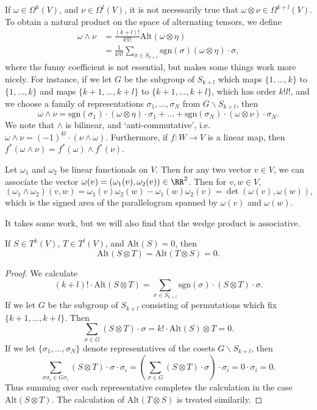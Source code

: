 If $\omega \in \Omega^k(V)$, and $\nu \in \Omega^l(V)$, it is not necessarily true that $\omega \otimes \nu \in \Omega^{k+l}(V)$. To obtain a natural product on the space of alternating tensors, we define
%
\begin{align*}
    \omega \wedge \nu &= \frac{(k+l)!}{k! l!} \text{Alt}(\omega \otimes \eta)\\
    &= \frac{1}{k!l!} \sum_{\sigma \in S_{k+l}} \text{sgn}(\sigma) (\omega \otimes \eta) \cdot \sigma,
\end{align*}
%
where the funny coefficient is not essential, but makes some things work more nicely. For instance, if we let $G$ be the subgroup of $S_{k+l}$ which maps $\{ 1, \dots, k \}$ to $\{ 1, \dots, k \}$ and maps $\{ k+1, \dots, k+l \}$ to $\{ k+1, \dots, k+l \}$, which has order $k! l!$, and we choose a family of representations $\sigma_1, \dots, \sigma_N$ from $G \backslash S_{k+l}$, then
%
\[ \omega \wedge \nu = \text{sgn}(\sigma_1) \cdot (\omega \otimes \eta) \cdot \sigma_1 + \dots + \text{sgn}(\sigma_N) \cdot (\omega \otimes \nu) \cdot \sigma_N. \]
%
We note that $\wedge$ is bilinear, and `anti-commutative', i.e. $\omega \wedge \nu = (-1)^{kl} \cdot (\nu \wedge \omega)$. Furthermore, if $f: W \to V$ is a linear map, then $f^*(\omega \wedge \nu) = f^*(\omega) \wedge f^*(\nu)$.

\begin{example}
    Let $\omega_1$ and $\omega_2$ be linear functionals on $V$. Then for any two vector $v \in V$, we can associate the vector $\omega(v) = (\omega_1(v), \omega_2(v)) \in \RR^2$. Then for $v,w \in V$,
    \[ (\omega_1 \wedge \omega_2)(v,w) = \omega_1(v) \omega_2(w) - \omega_1(w) \omega_2(v) = \det(\omega(v), \omega(w)), \]
    which is the signed area of the parallelogram spanned by $\omega(v)$ and $\omega(w)$.
\end{example}

It takes some work, but we will also find that the wedge product is associative.

\begin{lemma}
    If $S \in T^k(V)$, $T \in T^l(V)$, and $\text{Alt}(S) = 0$, then
    \[ \text{Alt}(S \otimes T) = \text{Alt}(T \otimes S) = 0. \]
\end{lemma}
\begin{proof}
    We calculate
    \[ (k+l)! \cdot \text{Alt}(S \otimes T) = \sum_{\sigma \in S_{k+l}} \text{sgn}(\sigma) \cdot (S \otimes T) \cdot \sigma. \]
    If we let $G$ be the subgroup of $S_{k+l}$ consisting of permutations which fix $\{ k+1, \dots, k+l \}$. Then
    \[ \sum_{\sigma \in G} (S \otimes T) \cdot \sigma = k! \cdot \text{Alt}(S) \otimes T = 0. \]
    If we let $\{ \sigma_1, \dots, \sigma_N \}$ denote representatives of the cosets $G \backslash S_{k+l}$, then
    \[ \sum_{\sigma \sigma_i \in G \sigma_i} (S \otimes T) \cdot \sigma \cdot \sigma_i = \left( \sum_{\sigma \in G} (S \otimes T) \cdot \sigma \right) \cdot \sigma_i = 0 \cdot \sigma_i = 0. \]
    Thus summing over each representative completes the calculation in the case $\text{Alt}(S \otimes T)$. The calculation of $\text{Alt}(T \otimes S)$ is treated similarily.
\end{proof}

